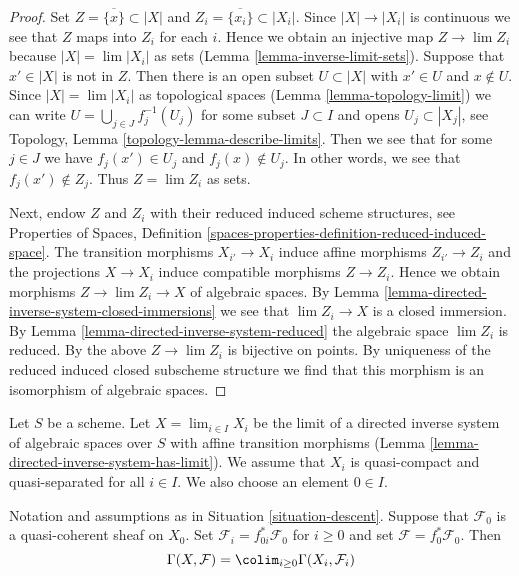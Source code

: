 \begin{proof}
Set $Z = \overline{\{x\}} \subset |X|$ and
$Z_i = \overline{\{x_i\}} \subset |X_i|$.
Since $|X| \to |X_i|$ is continuous we see that $Z$ maps into $Z_i$
for each $i$. Hence we obtain an injective map $Z \to \lim Z_i$
because $|X| = \lim |X_i|$ as sets (Lemma \ref{lemma-inverse-limit-sets}).
Suppose that $x' \in |X|$ is not in $Z$.
Then there is an open subset $U \subset |X|$ with $x' \in U$
and $x \not \in U$. Since
$|X| = \lim |X_i|$ as topological spaces (Lemma \ref{lemma-topology-limit})
we can write $U = \bigcup_{j \in J} f_j^{-1}(U_j)$
for some subset $J \subset I$ and opens $U_j \subset |X_j|$, see
Topology, Lemma \ref{topology-lemma-describe-limits}.
Then we see that for some $j \in J$ we have $f_j(x') \in U_j$
and $f_j(x) \not \in U_j$. In other words, we see that $f_j(x') \not \in Z_j$.
Thus $Z = \lim Z_i$ as sets.

\medskip\noindent
Next, endow $Z$ and $Z_i$ with their reduced induced scheme structures, see
Properties of Spaces, Definition
\ref{spaces-properties-definition-reduced-induced-space}.
The transition morphisms $X_{i'} \to X_i$ induce affine
morphisms $Z_{i'} \to Z_i$ and the projections $X \to X_i$
induce compatible morphisms $Z \to Z_i$.
Hence we obtain morphisms $Z \to \lim Z_i \to X$ of algebraic spaces.
By Lemma \ref{lemma-directed-inverse-system-closed-immersions}
we see that $\lim Z_i \to X$ is a
closed immersion. By Lemma \ref{lemma-directed-inverse-system-reduced}
the algebraic space $\lim Z_i$ is reduced.
By the above $Z \to \lim Z_i$ is bijective on points.
By uniqueness of the reduced induced closed subscheme structure
we find that this morphism is an isomorphism of algebraic spaces.
\end{proof}

\begin{situation}
\label{situation-descent}
Let $S$ be a scheme. Let $X = \lim_{i \in I} X_i$ be the limit of a directed
inverse system of algebraic spaces over $S$ with affine transition morphisms
(Lemma \ref{lemma-directed-inverse-system-has-limit}).
We assume that $X_i$ is quasi-compact and quasi-separated for all $i \in I$.
We also choose an element $0 \in I$.
\end{situation}

\begin{lemma}
\label{lemma-descend-section}
Notation and assumptions as in Situation \ref{situation-descent}.
Suppose that $\mathcal{F}_0$ is a quasi-coherent sheaf on $X_0$.
Set $\mathcal{F}_i = f_{0i}^*\mathcal{F}_0$ for $i \geq 0$ and set
$\mathcal{F} = f_0^*\mathcal{F}_0$. Then
$$
\Gamma(X, \mathcal{F}) = \colim_{i \geq 0} \Gamma(X_i, \mathcal{F}_i)
$$
\end{lemma}

